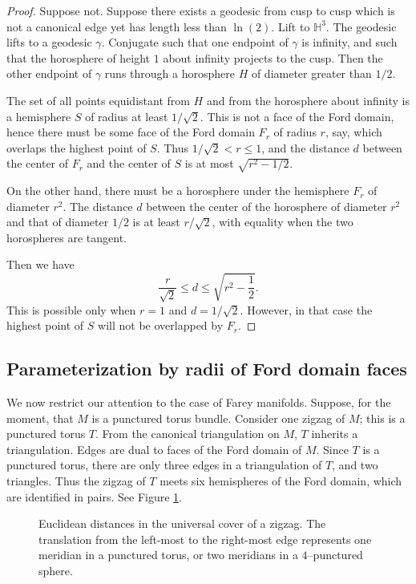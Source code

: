\documentclass[11pt]{amsart}
\newcommand{\HH}{{\mathbb{H}}}
\theoremstyle{plain}
\theoremstyle{definition}
\begin{document}
\begin{proof}
Suppose not.  Suppose there exists a geodesic from cusp to cusp which
is not a canonical edge yet has length less than $\ln(2)$.  Lift to
$\HH^3$.  The geodesic lifts to a geodesic $\gamma$.  Conjugate such
that one endpoint of $\gamma$ is infinity, and such that the
horosphere of height $1$ about infinity projects to the cusp.  Then
the other endpoint of $\gamma$ runs through a horosphere $H$ of
diameter greater than $1/2$.

The set of all points equidistant from $H$ and from the horosphere
about infinity is a hemisphere $S$ of radius at least $1/\sqrt{2}$.
This is not a face of the Ford domain, hence there must be some face
of the Ford domain $F_r$ of radius $r$, say, which overlaps the
highest point of $S$.  Thus $1/\sqrt{2} < r \leq 1$, and the distance
$d$ between the center of $F_r$ and the center of $S$ is at most
$\sqrt{r^2-1/2}$.

On the other hand, there must be a horosphere under the hemisphere
$F_r$ of diameter $r^2$.  The distance $d$ between the center of the
horosphere of diameter $r^2$ and that of diameter $1/2$ is at least
$r/\sqrt{2}$, with equality when the two horospheres are tangent.

Then we have
$$ \frac{r}{\sqrt{2}} \leq d \leq \sqrt{r^2 - \frac{1}{2}}.$$
%
This is possible only when $r = 1$ and $d=1/\sqrt{2}$.  However, in that case the
highest point of $S$ will not be overlapped by $F_r$.
\end{proof}

\subsection{Parameterization by radii of Ford domain faces}\label{subsec:param}

We now restrict our attention to the case of Farey manifolds. Suppose,
for the moment, that $M$ is a punctured torus bundle.  Consider one
zigzag of $M$; this is a punctured torus $T$.  From the canonical
triangulation on $M$, $T$ inherits a triangulation.  Edges are dual to
faces of the Ford domain of $M$.  Since $T$ is a punctured torus,
there are only three edges in a triangulation of $T$, and two
triangles.  Thus the zigzag of $T$ meets six hemispheres of the Ford domain,
which are identified in pairs.  See Figure \ref{fig:torus-lengths}.

\begin{figure}%
\centerline{}
\caption{Euclidean distances in the universal cover of a zigzag.  The
translation from the left-most to the right-most edge represents one
meridian in a punctured torus, or two meridians in a $4$--punctured
sphere.}
\label{fig:torus-lengths}
\end{figure}
\end{document}
